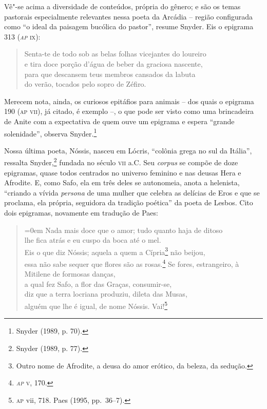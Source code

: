 Vê"-se acima a diversidade de conteúdos, própria do gênero; e são os temas
pastorais especialmente relevantes nessa poeta da Arcádia -- região configurada
como “o ideal da paisagem bucólica do pastor”, resume Snyder. Eis o epigrama
313 (\textsc{\textit{ap}} \textsc{ix}):

\begin{quote}
Senta-te de todo sob as belas folhas vicejantes do loureiro\\
e tira doce porção d’água de beber da graciosa nascente,\\
para que descansem teus membros cansados da labuta\\
do verão, tocados pelo sopro de Zéfiro.
\end{quote}

Merecem nota, ainda, os curiosos epitáfios para animais -- dos quais o epigrama
190 (\textsc{ap} \textsc{vii}), já citado, é exemplo --, o que pode ser visto como uma
brincadeira de Anite com a expectativa de quem ouve um epigrama e espera
“grande solenidade”, observa Snyder.\footnote{ Snyder (1989, p. 70).} 

Nossa última poeta, Nóssis, nasceu em Lócris, “colônia grega no sul da Itália”,
ressalta Snyder,\footnote{Snyder (1989, p. 77).} fundada no século \textsc{vii} a.C. Seu \textit{corpus} se
compõe de doze epigramas, quase todos centrados no
universo feminino e nas deusas Hera e Afrodite. E, como Safo, ela em três deles
se autonomeia, anota a helenista, ``criando a vívida \textit{persona} de uma
mulher que celebra as delícias de Eros e que se proclama, ela própria,
seguidora da tradição poética'' da poeta de Lesbos. Cito dois epigramas,
novamente em tradução de Paes:

\begin{quote}\parindent=0em
Nada mais doce que o amor; tudo quanto haja de ditoso\\
lhe fica atrás e eu cuspo da boca até o mel.\\
Eis o que diz Nóssis; aquela a quem a Cípria\footnote{ Outro nome de
Afrodite, a deusa do amor erótico, da beleza, da sedução.} não beijou,\\
essa não sabe sequer que flores são as rosas.\footnote{\textsc{\textit{ap} v}, 170.}
\smallskip
Se fores, estrangeiro, à Mitilene de formosas danças,\\
a qual fez Safo, a flor das Graças, consumir-se,\\ 
diz que a terra locriana produziu, dileta das Musas,\\
alguém que lhe é igual, de nome Nóssis. Vai!\footnote{\textsc{ap} vii, 718. Paes (1995, pp.~36--7).} %
\end{quote}


